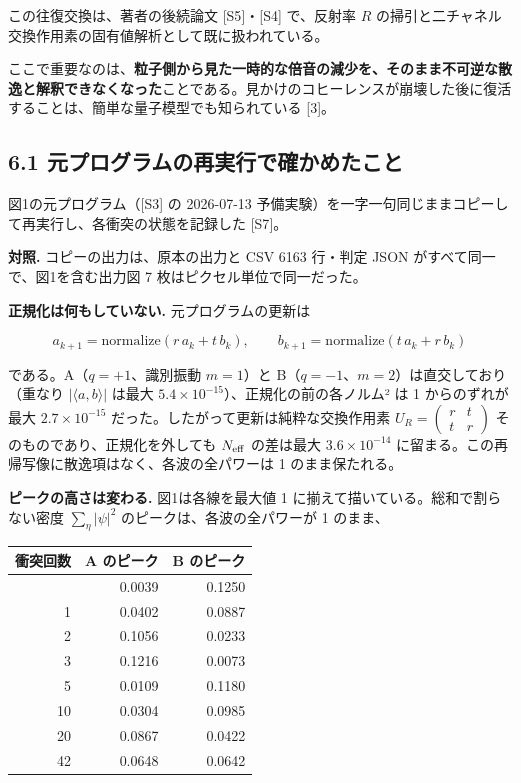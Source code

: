 \documentclass[
  a4paper,
]{ltjsarticle}
\newcounter{none} %
\begin{document}
この往復交換は、著者の後続論文 {[}S5{]}・{[}S4{]} で、反射率 \(R\)
の掃引と二チャネル交換作用素の固有値解析として既に扱われている。

ここで重要なのは、\textbf{粒子側から見た一時的な倍音の減少を、そのまま不可逆な散逸と解釈できなくなった}ことである。見かけのコヒーレンスが崩壊した後に復活することは、簡単な量子模型でも知られている
{[}3{]}。

\subsection{6.1
元プログラムの再実行で確かめたこと}\label{ux5143ux30d7ux30edux30b0ux30e9ux30e0ux306eux518dux5b9fux884cux3067ux78baux304bux3081ux305fux3053ux3068}

図1の元プログラム（{[}S3{]} の 2026-07-13
予備実験）を一字一句同じままコピーして再実行し、各衝突の状態を記録した
{[}S7{]}。

\textbf{対照.} コピーの出力は、原本の出力と CSV 6163 行・判定 JSON
がすべて同一で、図1を含む出力図 7 枚はピクセル単位で同一だった。

\textbf{正規化は何もしていない.} 元プログラムの更新は

\[
a_{k+1}=\mathrm{normalize}(r\,a_k+t\,b_k),\qquad b_{k+1}=\mathrm{normalize}(t\,a_k+r\,b_k)
\]

である。A（\(q=+1\)、識別振動 \(m=1\)）と
B（\(q=-1\)、\(m=2\)）は直交しており（重なり \(|\langle a,b\rangle|\)
は最大 \(5.4\times10^{-15}\)）、正規化の前の各ノルム² は 1
からのずれが最大 \(2.7\times10^{-15}\)
だった。したがって更新は純粋な交換作用素
\(U_R=\begin{pmatrix}r&t\\t&r\end{pmatrix}\)
そのものであり、正規化を外しても \(N_{\rm eff}\) の差は最大
\(3.6\times10^{-14}\)
に留まる。この再帰写像に散逸項はなく、各波の全パワーは 1
のまま保たれる。

\textbf{ピークの高さは変わる.} 図1は各線を最大値 1
に揃えて描いている。総和で割らない密度 \(\sum_\eta|\psi|^2\)
のピークは、各波の全パワーが 1 のまま、

{\def\LTcaptype{none} %
\begin{longtable}[]{@{}rrr@{}}
\toprule\noalign{}
衝突回数 & A のピーク & B のピーク \\
\midrule\noalign{}
\endhead
\bottomrule\noalign{}
\endlastfoot
0 & 0.0039 & 0.1250 \\
1 & 0.0402 & 0.0887 \\
2 & 0.1056 & 0.0233 \\
3 & 0.1216 & 0.0073 \\
5 & 0.0109 & 0.1180 \\
10 & 0.0304 & 0.0985 \\
20 & 0.0867 & 0.0422 \\
42 & 0.0648 & 0.0642 \\
\end{longtable}
}
\end{document}
